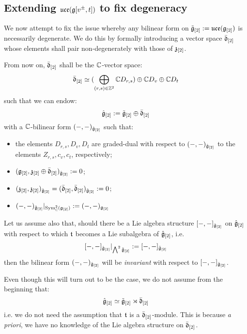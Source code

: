         \subsection{Extending \texorpdfstring{$ \mathfrak{uce}(\mathfrak{g}[v^{\pm}, t]) $}{} to fix degeneracy}
            We now attempt to fix the issue whereby any bilinear form on $\tilde{\mathfrak{g}}_{[2]}:= \mathfrak{uce}(\mathfrak{g}_{[2]})$ is necessarily degenerate. We do this by formally introducing a  vector space $\bar{\mathfrak{d}}_{[2]}$ whose elements shall pair non-degenerately with those of $\mathfrak{z}_{[2]}$. 
            \begin{convention} \label{conv: orthogonal_complement_of_toroidal_centres}
                From now on, $\bar{\mathfrak{d}}_{[2]}$ shall be the $\mathbb{C}$-vector space:
                    $$\bar{\mathfrak{d}}_{[2]} \simeq ( \bigoplus_{(r, s) \in \mathbb{Z}^2} \mathbb{C} D_{r, s} ) \oplus \mathbb{C} D_v \oplus \mathbb{C} D_t$$
                such that we can endow:
                    $$\hat{\mathfrak{g}}_{[2]} := \tilde{\mathfrak{g}}_{[2]}\oplus \bar{\mathfrak{d}}_{[2]}$$
                with a $\mathbb{C}$-bilinear form $(-, -)_{\hat{\mathfrak{g}}_{[2]}}$ such that:
                \begin{itemize}
                    \item the elements $D_{r, s}, D_v, D_t$ are graded-dual with respect to $(-, -)_{\hat{\mathfrak{g}}_{[2]}}$ to the elements $Z_{r, s}, c_v, c_t$, respectively;
                    \item $(\mathfrak{g}_{[2]}, \mathfrak{z}_{[2]} \oplus \bar{\mathfrak{d}}_{[2]})_{\hat{\mathfrak{g}}_{[2]}} := 0$;
                    \item $(\mathfrak{z}_{[2]}, \mathfrak{z}_{[2]})_{\hat{\mathfrak{g}}_{[2]}} = (\bar{\mathfrak{d}}_{[2]}, \bar{\mathfrak{d}}_{[2]})_{\hat{\mathfrak{g}}_{[2]}} := 0$;
                    \item $(-, -)_{\hat{\mathfrak{g}}_{[2]}}|_{\mathrm{Sym}^2_{\mathbb{C}}(\mathfrak{g}_{[2]})} := (-, -)_{\mathfrak{g}_{[2]}}$
                \end{itemize}
            \end{convention}
            \begin{convention}
                Let us assume also that, should there be a Lie algebra structure $[-, -]_{\hat{\mathfrak{g}}_{[2]}}$ on $\hat{\mathfrak{g}}_{[2]}$ with respect to which $\mathfrak{t}$ becomes a Lie subalgebra of $\hat{\mathfrak{g}}_{[2]}$, i.e.
                    $$[-, -]_{\hat{\mathfrak{g}}_{[2]}}|_{\bigwedge^2 \tilde{\mathfrak{g}}_{[2]}} := [-, -]_{\tilde{\mathfrak{g}}_{[2]}}$$
                then the bilinear form $(-, -)_{\hat{\mathfrak{g}}_{[2]}}$ will be \textit{invariant} with respect to $[-, -]_{\hat{\mathfrak{g}}_{[2]}}$.

                Even though this will turn out to be the case, we do not assume from the beginning that:
                    $$\hat{\mathfrak{g}}_{[2]} \simeq \tilde{\mathfrak{g}}_{[2]}\rtimes \bar{\mathfrak{d}}_{[2]}$$
                i.e. we do not need the assumption that $\mathfrak{t}$ is a $\bar{\mathfrak{d}}_{[2]}$-module. This is because \textit{a priori}, we have no knowledge of the Lie algebra structure on $\bar{\mathfrak{d}}_{[2]}$.
            \end{convention}

